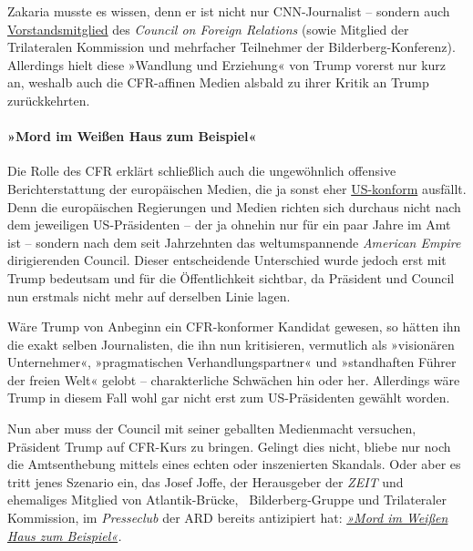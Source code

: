 Zakaria musste es wissen, denn er ist nicht nur CNN-Journalist --
sondern auch
\href{https://www.cfr.org/board-directors}{Vorstandsmitglied} des
\emph{Council on Foreign Relations} (sowie Mitglied der Trilateralen
Kommission und mehrfacher Teilnehmer der Bilderberg-Konferenz).
Allerdings hielt diese »Wandlung und Erziehung« von Trump vorerst nur
kurz an, weshalb auch die CFR-affinen Medien alsbald zu ihrer Kritik an
Trump zurückkehrten.

\hypertarget{mord-im-weiuxdfen-haus-zum-beispiel}{%
\paragraph{»Mord im Weißen Haus zum
Beispiel«}\label{mord-im-weiuxdfen-haus-zum-beispiel}}

Die Rolle des CFR erklärt schließlich auch die ungewöhnlich offensive
Berichterstattung der europäischen Medien, die ja sonst eher
\href{https://swprs.org/die-nzz-studie/}{US-konform} ausfällt. Denn die
europäischen Regierungen und Medien richten sich durchaus nicht nach dem
jeweiligen US-Präsidenten -- der ja ohnehin nur für ein paar Jahre im
Amt ist -- sondern nach dem seit Jahrzehnten das weltumspannende
\emph{American Empire} dirigierenden Council. Dieser entscheidende
Unterschied wurde jedoch erst mit Trump bedeutsam und für die
Öffentlichkeit sichtbar, da Präsident und Council nun erstmals nicht
mehr auf derselben Linie lagen.

Wäre Trump von Anbeginn ein CFR-konformer Kandidat gewesen, so hätten
ihn die exakt selben Journalisten, die ihn nun kritisieren, vermutlich
als »visionären Unternehmer«, »pragmatischen Verhandlungspartner« und
»standhaften Führer der freien Welt« gelobt -- charakterliche Schwächen
hin oder her. Allerdings wäre Trump in diesem Fall wohl gar nicht erst
zum US-Präsidenten gewählt worden.

Nun aber muss der Council mit seiner geballten Medienmacht versuchen,
Präsident Trump auf CFR-Kurs zu bringen. Gelingt dies nicht, bliebe nur
noch die Amtsenthebung mittels eines echten oder inszenierten Skandals.
Oder aber es tritt jenes Szenario ein, das Josef Joffe, der Herausgeber
der \emph{ZEIT} und ehemaliges Mitglied von Atlantik-Brücke,~
Bilderberg-Gruppe und Trilateraler Kommission, im \emph{Presseclub} der
ARD bereits antizipiert hat:
\emph{\href{https://swprs.org/video-joffe-trump/}{»Mord im Weißen Haus
zum Beispiel«}.}

